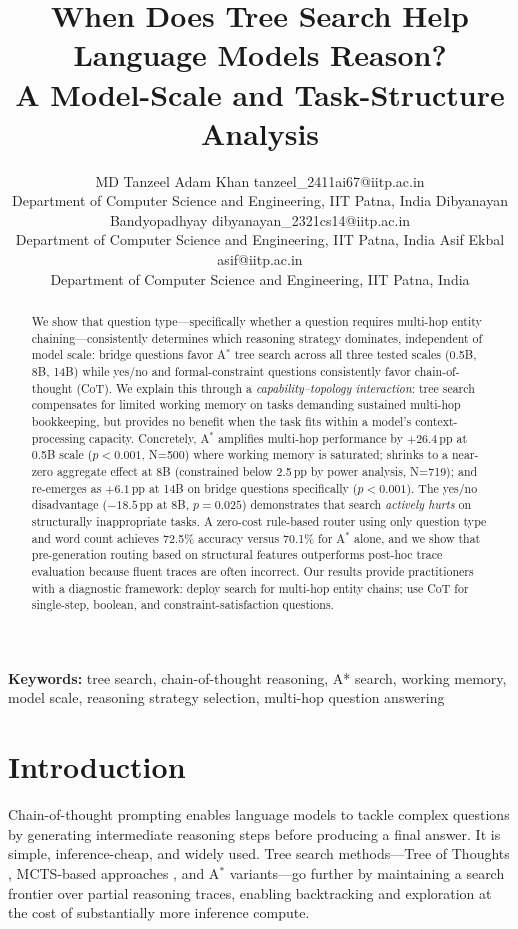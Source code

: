 \documentclass{article}
\title{When Does Tree Search Help Language Models Reason?\\
A Model-Scale and Task-Structure Analysis}
\author{%
  \name MD Tanzeel Adam Khan \email tanzeel\_2411ai67@iitp.ac.in \\
  \addr Department of Computer Science and Engineering, IIT Patna, India
  \AND
  \name Dibyanayan Bandyopadhyay \email dibyanayan\_2321cs14@iitp.ac.in \\
  \addr Department of Computer Science and Engineering, IIT Patna, India
  \AND
  \name Asif Ekbal \email asif@iitp.ac.in \\
  \addr Department of Computer Science and Engineering, IIT Patna, India
}
\newcommand{\astar}{A$^*$\xspace}
\begin{document}
\maketitle

\begin{abstract}
We show that question type---specifically whether a question requires multi-hop entity chaining---consistently determines which reasoning strategy dominates, independent of model scale: bridge questions favor \astar tree search across all three tested scales (0.5B, 8B, 14B) while yes/no and formal-constraint questions consistently favor chain-of-thought (CoT). We explain this through a \emph{capability--topology interaction}: tree search compensates for limited working memory on tasks demanding sustained multi-hop bookkeeping, but provides no benefit when the task fits within a model's context-processing capacity. Concretely, \astar amplifies multi-hop performance by $+26.4$\,pp at 0.5B scale ($p<0.001$, N=500) where working memory is saturated; shrinks to a near-zero aggregate effect at 8B (constrained below 2.5\,pp by power analysis, N=719); and re-emerges as $+6.1$\,pp at 14B on bridge questions specifically ($p<0.001$). The yes/no disadvantage ($-18.5$\,pp at 8B, $p=0.025$) demonstrates that search \emph{actively hurts} on structurally inappropriate tasks. A zero-cost rule-based router using only question type and word count achieves 72.5\% accuracy versus 70.1\% for \astar alone, and we show that pre-generation routing based on structural features outperforms post-hoc trace evaluation because fluent traces are often incorrect. Our results provide practitioners with a diagnostic framework: deploy search for multi-hop entity chains; use CoT for single-step, boolean, and constraint-satisfaction questions.
\end{abstract}

\textbf{Keywords:} tree search, chain-of-thought reasoning, A* search, working memory, model scale, reasoning strategy selection, multi-hop question answering

\section{Introduction}
\label{sec:intro}

Chain-of-thought prompting \citep{wei2023chainofthoughtpromptingelicitsreasoning} enables language models to tackle complex questions by generating intermediate reasoning steps before producing a final answer. It is simple, inference-cheap, and widely used. Tree search methods---Tree of Thoughts \citep{yao2023treethoughtsdeliberateproblem}, MCTS-based approaches \citep{zhang2024accessinggpt4levelmathematical}, and \astar variants---go further by maintaining a search frontier over partial reasoning traces, enabling backtracking and exploration at the cost of substantially more inference compute.
\end{document}
